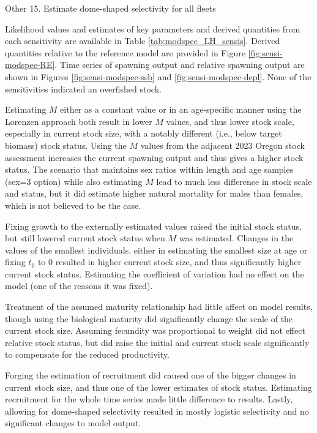 \documentclass[11pt,
  letterpaper,
]{article}
\begin{document}
Other 15. Estimate dome-shaped selectivity for all fleets

Likelihood values and estimates of key parameters and derived quantities from each sensitivity are available in Table \ref{tab:modspec_LH_sensis}. Derived quantities relative to the reference model are provided in Figure \ref{fig:sensi-modspec-RE}. Time series of spawning output and relative spawning output are shown in Figures \ref{fig:sensi-modspec-ssb} and \ref{fig:sensi-modspec-depl}. None of the sensitivities indicated an overfished stock.

Estimating \(M\) either as a constant value or in an age-specific manner using the Lorenzen approach both result in lower \(M\) values, and thus lower stock scale, especially in current stock size, with a notably different (i.e., below target biomass) stock status. Using the \(M\) values from the adjacent 2023 Oregon stock assessment increases the current spawning output and thus gives a higher stock status. The scenario that maintains sex ratios within length and age samples (sex=3 option) while also estimating \(M\) lead to much less difference in stock scale and status, but it did estimate higher natural mortality for males than females, which is not believed to be the case.

Fixing growth to the externally estimated values raised the initial stock status, but still lowered current stock status when \(M\) was estimated. Changes in the values of the smallest individuals, either in estimating the smallest size at age or fixing \(t_0\) to 0 resulted in higher current stock size, and thus significantly higher current stock status. Estimating the coefficient of variation had no effect on the model (one of the reasons it was fixed).

Treatment of the assumed maturity relationship had little affect on model results, though using the biological maturity did significantly change the scale of the current stock size. Assuming fecundity was proportional to weight did not effect relative stock status, but did raise the initial and current stock scale significantly to compensate for the reduced productivity.

Forging the estimation of recruitment did caused one of the bigger changes in current stock size, and thus one of the lower estimates of stock status. Estimating recruitment for the whole time series made little difference to results. Lastly, allowing for dome-shaped selectivity resulted in mostly logistic selectivity and no significant changes to model output.
\end{document}
